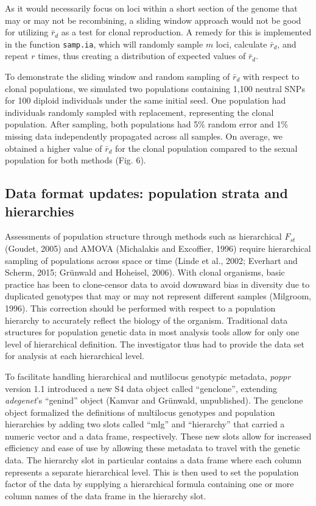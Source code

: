 \documentclass{frontiersSCNS} %
\begin{document}
As it would necessarily focus on loci within a short section of the
genome that may or may not be recombining, a sliding window approach
would not be good for utilizing \(\bar{r}_d\) as a test for clonal
reproduction. A remedy for this is implemented in the function
\texttt{samp.ia}, which will randomly sample \(m\) loci, calculate
\(\bar{r}_d\), and repeat \(r\) times, thus creating a distribution of
expected values of \(\bar{r}_d\).

To demonstrate the sliding window and random sampling of \(\bar{r}_d\)
with respect to clonal populations, we simulated two populations
containing 1,100 neutral SNPs for 100 diploid individuals under the same
initial seed. One population had individuals randomly sampled with
replacement, representing the clonal population. After sampling, both
populations had 5\% random error and 1\% missing data independently
propagated across all samples. On average, we obtained a higher value of
\(\bar{r}_d\) for the clonal population compared to the sexual
population for both methods (Fig. 6).

\subsection*{Data format updates: population strata and
hierarchies}\label{data-format-updates-population-strata-and-hierarchies}

Assessments of population structure through methods such as hierarchical
\(F_{st}\) (Goudet, 2005) and AMOVA (Michalakis and Excoffier, 1996)
require hierarchical sampling of populations across space or time (Linde
et al., 2002; Everhart and Scherm, 2015; Gr{\"{u}}nwald and Hoheisel, 2006).
With clonal organisms, basic practice has been to clone-censor data to
avoid downward bias in diversity due to duplicated genotypes that may or
may not represent different samples (Milgroom, 1996). This correction
should be performed with respect to a population hierarchy to accurately
reflect the biology of the organism. Traditional data structures for
population genetic data in most analysis tools allow for only one level
of hierarchical definition. The investigator thus had to provide the
data set for analysis at each hierarchical level.

To facilitate handling hierarchical and mutlilocus genotypic metadata,
\emph{poppr} version 1.1 introduced a new S4 data object called
``genclone'', extending \emph{adegenet}'s ``genind'' object (Kamvar and
Gr\"{u}nwald, unpublished). The genclone object formalized the definitions
of multilocus genotypes and population hierarchies by adding two slots
called ``mlg'' and ``hierarchy'' that carried a numeric vector and a
data frame, respectively. These new slots allow for increased efficiency
and ease of use by allowing these metadata to travel with the genetic
data. The hierarchy slot in particular contains a data frame where each
column represents a separate hierarchical level. This is then used to
set the population factor of the data by supplying a hierarchical
formula containing one or more column names of the data frame in the
hierarchy slot.
\end{document}
